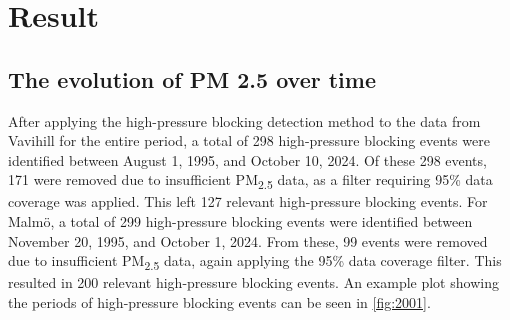 \section{Result}
\subsection{The evolution of PM 2.5 over time}

After applying the high-pressure blocking detection method to the data from Vavihill for the entire period, a total of 298 high-pressure blocking events were identified between August 1, 1995, and October 10, 2024. Of these 298 events, 171 were removed due to insufficient PM\textsubscript{2.5} data, as a filter requiring 95\% data coverage was applied. This left 127 relevant high-pressure blocking events. For Malmö, a total of 299 high-pressure blocking events were identified between November 20, 1995, and October 1, 2024. From these, 99 events were removed due to insufficient PM\textsubscript{2.5} data, again applying the 95\% data coverage filter. This resulted in 200 relevant high-pressure blocking events. An example plot showing the periods of high-pressure blocking events can be seen in \autoref{fig:2001}.


